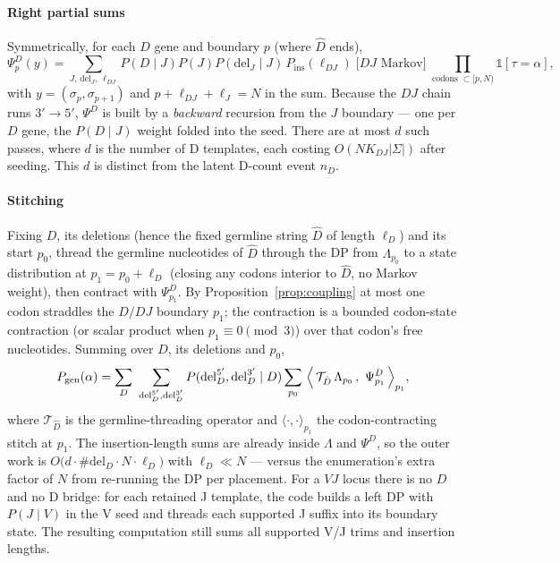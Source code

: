 \documentclass[11pt]{article}
\theoremstyle{oldplain}
\theoremstyle{oldrem}
\newcommand{\Pgen}{P_{\mathrm{gen}}}
\newcommand{\ins}{\mathrm{ins}}
\newcommand{\del}{\mathrm{del}}
\newcommand{\indic}{\mathds{1}}
\begin{document}
\paragraph{Right partial sums} Symmetrically, for each $D$ gene and boundary $p$ (where $\hat D$ ends),
\begin{equation}\label{eq:rho}
  \Psi^D_p(y)=\!\!\sum_{J,\,\del_J,\,\ell_{DJ}}\!\!
    P(D\!\mid\! J)P(J)P(\del_J\mid J)\,P_{\ins}(\ell_{DJ})\;\bigl[\text{$DJ$ Markov}\bigr]\;
    \prod_{\text{codons }\subset[p,N)}\!\!\indic[\tau=\alpha],
\end{equation}
with $y=(\sigma_p,\sigma_{p+1})$ and
$p+\ell_{DJ}+\ell_J=N$ in the sum. Because the $DJ$ chain runs $3'\!\to\!5'$, $\Psi^D$ is built by a
\emph{backward} recursion from the $J$ boundary --- one per $D$ gene, the $P(D\mid J)$ weight folded into
the seed. There are at most $d$ such passes, where $d$ is the number of D templates,
each costing $O(NK_{DJ}|\Sigma|)$ after seeding.
This $d$ is distinct from the latent D-count event $n_D$.

\paragraph{Stitching} Fixing $D$, its deletions (hence the fixed germline string $\hat D$ of length
$\ell_D$) and its start $p_0$, thread the germline nucleotides of $\hat D$ through the DP from $\Lambda_{p_0}$
to a state distribution at $p_1=p_0+\ell_D$ (closing any codons interior to $\hat D$, no Markov weight),
then contract with $\Psi^D_{p_1}$. By Proposition~\ref{prop:coupling} at most one codon straddles the
$D/DJ$ boundary $p_1$; the contraction is a bounded codon-state contraction (or scalar product when $p_1\equiv0\pmod3$) over that
codon's free nucleotides. Summing over $D$, its deletions and $p_0$,
\begin{equation}\label{eq:stitch}
  \Pgen(\alpha)=\sum_D\ \sum_{\del_D^{5'},\del_D^{3'}} P(\del_D^{5'},\del_D^{3'}\mid D)
    \sum_{p_0}\ \Bigl\langle\, \mathcal{T}_{\hat D}\,\Lambda_{p_0}\,,\ \Psi^D_{p_1}\,\Bigr\rangle_{p_1},
\end{equation}
where $\mathcal{T}_{\hat D}$ is the germline-threading operator and $\langle\cdot,\cdot\rangle_{p_1}$ the
codon-contracting stitch at $p_1$. The insertion-length sums are already inside $\Lambda$ and $\Psi^D$, so
the outer work is $O\!\bigl(d\cdot\#\!\del_D\cdot N\cdot\ell_D\bigr)$ with $\ell_D\ll N$ --- versus the
enumeration's extra factor of $N$ from re-running the DP per placement. For a $VJ$ locus there is no $D$
and no D bridge: for each retained J template, the code builds a left DP with
$P(J\mid V)$ in the V seed and threads each supported J suffix into its boundary state.
The resulting computation still sums all supported V/J trims and insertion lengths.
\end{document}
